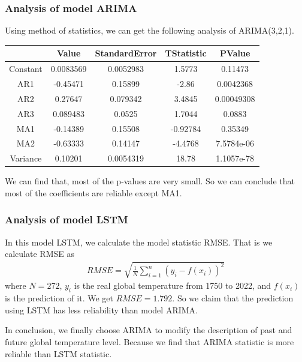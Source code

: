 \documentclass{apmcmthesis}
\begin{document}
\subsubsection{Analysis of model ARIMA}

Using method of statistics, we can get the following analysis of ARIMA(3,2,1).

\begin{center}
\begin{tabular}{c|cccc}
  \hline
   &Value& StandardError& TStatistic &PValue\\
  \hline
  Constant  &  0.0083569    &  0.0052983    &     1.5773    &    0.11473\\
    AR{1}    &    -0.45471   &     0.15899  &        -2.86  &    0.0042368\\
    AR{2}    &    0.27647    &   0.079342   &      3.4845   &  0.00049308\\
    AR{3}    &  0.089483     &    0.0525    &     1.7044    &     0.0883\\
    MA{1}   &     -0.14389   &     0.15508  &     -0.92784  &      0.35349\\
    MA{2}    &    -0.63333   &     0.14147  &      -4.4768  &   7.5784e-06\\
    Variance  &    0.10201   &   0.0054319  &        18.78  &   1.1057e-78\\
  \hline
  \end{tabular}
\end{center}

We can find that, most of the p-values are very small.
So we can conclude that most of the coefficients are reliable except MA{1}.

\subsubsection{Analysis of model LSTM}
In this model LSTM, we calculate the model statistic RMSE.
That is we calculate RMSE as 
\begin{align*}
  RMSE=\sqrt{\frac{1}{N} \sum_{i=1}^n (y_i - f(x_i))^2} 
\end{align*}
where $N=272$, $y_i$ is the real global temperature from 1750 to 2022, and $f(x_i)$ is the prediction of it.
We get $RMSE = 1.792$. 
So we claim that the prediction using LSTM has less reliability than model ARIMA.

In conclusion, we finally choose ARIMA to modify the description of past and future global temperature level.
Because we find that ARIMA statistic is more reliable than LSTM statistic.
\end{document}
